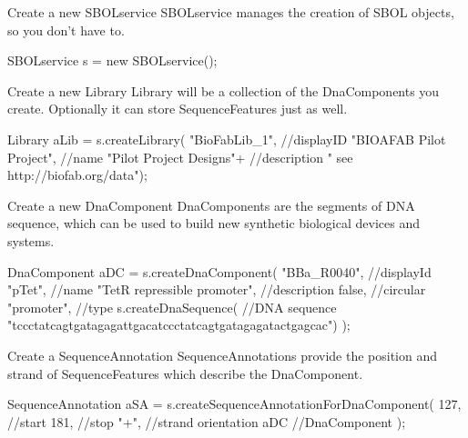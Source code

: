 \begin{DoxyEnumerate}
\item \begin{DoxyParagraph}{Create a new SBOLservice}
SBOLservice manages the creation of SBOL objects, so you don't have to. 
\begin{DoxyCode}
SBOLservice s = new SBOLservice();
\end{DoxyCode}

\end{DoxyParagraph}

\item \begin{DoxyParagraph}{Create a new Library}
Library will be a collection of the DnaComponents you create. Optionally it can store SequenceFeatures just as well. 
\begin{DoxyCode}
Library aLib = s.createLibrary(
                      "BioFabLib_1",                   //displayID
                      "BIOAFAB Pilot Project",         //name
                      "Pilot Project Designs"+         //description
                      " see http://biofab.org/data");
\end{DoxyCode}

\end{DoxyParagraph}

\item \begin{DoxyParagraph}{Create a new DnaComponent}
DnaComponents are the segments of DNA sequence, which can be used to build new synthetic biological devices and systems. 
\begin{DoxyCode}
DnaComponent aDC = s.createDnaComponent(
                "BBa_R0040",                 //displayId
                "pTet",                      //name
                "TetR repressible promoter", //description
                false,                       //circular
                "promoter",                  //type
                s.createDnaSequence(         //DNA sequence
                     "tccctatcagtgatagagattgacatccctatcagtgatagagatactgagcac")
                );
\end{DoxyCode}

\end{DoxyParagraph}

\item \begin{DoxyParagraph}{Create a SequenceAnnotation}
SequenceAnnotations provide the position and strand of SequenceFeatures which describe the DnaComponent. 
\begin{DoxyCode}
SequenceAnnotation aSA = s.createSequenceAnnotationForDnaComponent(
                    127, //start
                    181, //stop
                    "+", //strand orientation
                    aDC  //DnaComponent
                    );
\end{DoxyCode}


\end{DoxyParagraph}
\end{DoxyEnumerate}
